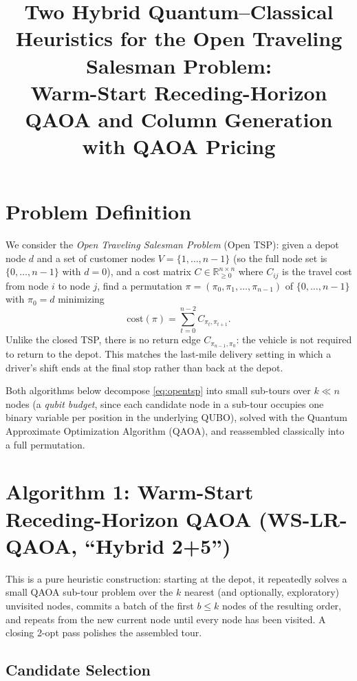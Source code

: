 \documentclass[11pt]{article}
\title{Two Hybrid Quantum--Classical Heuristics for the Open Traveling Salesman Problem:\\
Warm-Start Receding-Horizon QAOA and Column Generation with QAOA Pricing}
\author{}
\date{}
\newcommand{\Real}{\mathbb{R}}
\begin{document}
\maketitle

\section{Problem Definition}
\label{sec:problem}

We consider the \emph{Open Traveling Salesman Problem} (Open TSP): given a depot node $d$ and a set of customer nodes $V = \{1, \dots, n-1\}$ (so the full node set is $\{0,\dots,n-1\}$ with $d=0$), and a cost matrix $C \in \Real^{n\times n}_{\ge 0}$ where $C_{ij}$ is the travel cost from node $i$ to node $j$, find a permutation $\pi = (\pi_0, \pi_1, \dots, \pi_{n-1})$ of $\{0,\dots,n-1\}$ with $\pi_0 = d$ minimizing
\begin{equation}
  \mathrm{cost}(\pi) = \sum_{t=0}^{n-2} C_{\pi_t, \pi_{t+1}}.
  \label{eq:opentsp}
\end{equation}
Unlike the closed TSP, there is no return edge $C_{\pi_{n-1}, \pi_0}$: the vehicle is not required to return to the depot. This matches the last-mile delivery setting in which a driver's shift ends at the final stop rather than back at the depot.

Both algorithms below decompose \eqref{eq:opentsp} into small sub-tours over $k \ll n$ nodes (a \emph{qubit budget}, since each candidate node in a sub-tour occupies one binary variable per position in the underlying QUBO), solved with the Quantum Approximate Optimization Algorithm (QAOA), and reassembled classically into a full permutation.

\section{Algorithm 1: Warm-Start Receding-Horizon QAOA (WS-LR-QAOA, ``Hybrid 2+5'')}
\label{sec:hybrid}

This is a pure heuristic construction: starting at the depot, it repeatedly solves a small QAOA sub-tour problem over the $k$ nearest (and optionally, exploratory) unvisited nodes, commits a batch of the first $b \le k$ nodes of the resulting order, and repeats from the new current node until every node has been visited. A closing 2-opt pass polishes the assembled tour.

\subsection{Candidate Selection}
\label{sec:hybrid-candidates}
\end{document}

